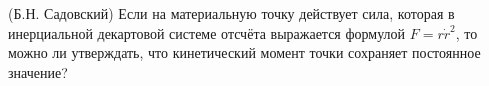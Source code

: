(Б.Н. Садовский)
Если на материальную точку действует сила, которая в инерциальной
декартовой системе отсчёта выражается формулой $F=r\dot r^2$, то можно
ли утверждать, что кинетический момент точки сохраняет постоянное
значение?

